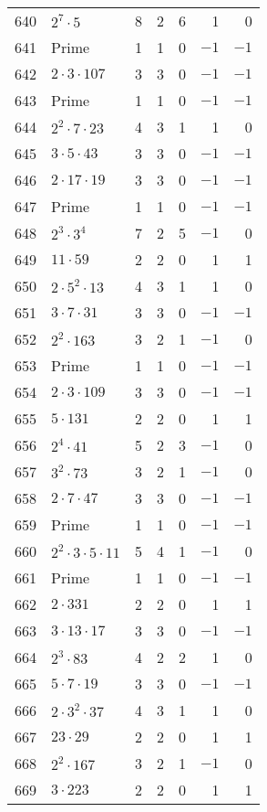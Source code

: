 \documentclass[12pt]{article}
\begin{document}
\begin{tabular}{|r|l|r|r|r|r|r|}
640 & $2^7 \cdot 5$ & 8 & 2 & 6 & 1 & 0 \\
641 & Prime & 1 & 1 & 0 & $-1$ & $-1$ \\
642 & $2 \cdot 3 \cdot 107$ & 3 & 3 & 0 & $-1$ & $-1$ \\
643 & Prime & 1 & 1 & 0 & $-1$ & $-1$ \\
644 & $2^2 \cdot 7 \cdot 23$ & 4 & 3 & 1 & 1 & 0 \\
645 & $3 \cdot 5 \cdot 43$ & 3 & 3 & 0 & $-1$ & $-1$ \\
646 & $2 \cdot 17 \cdot 19$ & 3 & 3 & 0 & $-1$ & $-1$ \\
647 & Prime & 1 & 1 & 0 & $-1$ & $-1$ \\
648 & $2^3 \cdot 3^4$ & 7 & 2 & 5 & $-1$ & 0 \\
649 & $11 \cdot 59$ & 2 & 2 & 0 & 1 & 1 \\
650 & $2 \cdot 5^2 \cdot 13$ & 4 & 3 & 1 & 1 & 0 \\
651 & $3 \cdot 7 \cdot 31$ & 3 & 3 & 0 & $-1$ & $-1$ \\
652 & $2^2 \cdot 163$ & 3 & 2 & 1 & $-1$ & 0 \\
653 & Prime & 1 & 1 & 0 & $-1$ & $-1$ \\
654 & $2 \cdot 3 \cdot 109$ & 3 & 3 & 0 & $-1$ & $-1$ \\
655 & $5 \cdot 131$ & 2 & 2 & 0 & 1 & 1 \\
656 & $2^4 \cdot 41$ & 5 & 2 & 3 & $-1$ & 0 \\
657 & $3^2 \cdot 73$ & 3 & 2 & 1 & $-1$ & 0 \\
658 & $2 \cdot 7 \cdot 47$ & 3 & 3 & 0 & $-1$ & $-1$ \\
659 & Prime & 1 & 1 & 0 & $-1$ & $-1$ \\
660 & $2^2 \cdot 3 \cdot 5 \cdot 11$ & 5 & 4 & 1 & $-1$ & 0 \\
661 & Prime & 1 & 1 & 0 & $-1$ & $-1$ \\
662 & $2 \cdot 331$ & 2 & 2 & 0 & 1 & 1 \\
663 & $3 \cdot 13 \cdot 17$ & 3 & 3 & 0 & $-1$ & $-1$ \\
664 & $2^3 \cdot 83$ & 4 & 2 & 2 & 1 & 0 \\
665 & $5 \cdot 7 \cdot 19$ & 3 & 3 & 0 & $-1$ & $-1$ \\
666 & $2 \cdot 3^2 \cdot 37$ & 4 & 3 & 1 & 1 & 0 \\
667 & $23 \cdot 29$ & 2 & 2 & 0 & 1 & 1 \\
668 & $2^2 \cdot 167$ & 3 & 2 & 1 & $-1$ & 0 \\
669 & $3 \cdot 223$ & 2 & 2 & 0 & 1 & 1 \\

\end{tabular}
\end{document}
